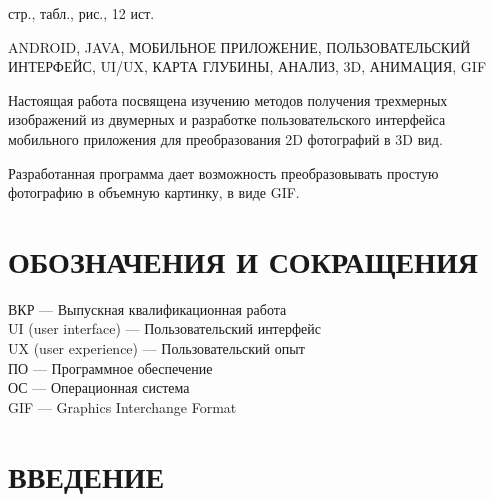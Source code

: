 \documentclass[a4paper,12pt]{article}
\begin{document}
 стр.,  табл.,  рис., 12 ист. 

ANDROID, JAVA, МОБИЛЬНОЕ ПРИЛОЖЕНИЕ, ПОЛЬЗОВАТЕЛЬСКИЙ ИНТЕРФЕЙС, UI/UX, КАРТА ГЛУБИНЫ, АНАЛИЗ, 3D, АНИМАЦИЯ, GIF

Настоящая работа посвящена изучению методов получения трехмерных изображений из двумерных и разработке пользовательского интерфейса мобильного приложения для преобразования 2D фотографий в 3D вид. 

Разработанная программа дает возможность преобразовывать простую фотографию в объемную картинку, в виде GIF.

\pagebreak
\thispagestyle{empty}

\section*{\centering ОБОЗНАЧЕНИЯ И СОКРАЩЕНИЯ}

ВКР --- Выпускная квалификационная работа\\

UI (user interface) --- Пользовательский интерфейс\\

UX (user experience) --- Пользовательский опыт\\

ПО --- Программное обеспечение\\

ОС --- Операционная система\\

GIF --- Graphics Interchange Format\\


\pagebreak

\tableofcontents

\pagebreak

\section*{\centering ВВЕДЕНИЕ}
\pagebreak

%
\pagebreak
\pagebreak
\pagebreak
\pagebreak
\pagebreak
\pagebreak
\end{document}
